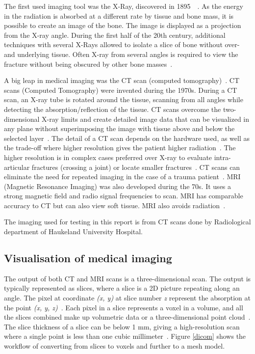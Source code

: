 \documentclass[a4paper]{report}
\begin{document}
The first used imaging tool was the X-Ray, discovered in 1895~\cite{hamblen_outline_2010}~\cite{suetens_fundamentals_2017}. As the energy in the radiation is absorbed at a different rate by tissue and bone mass, it is possible to create an image of the bone. The image is displayed as a projection from the X-ray angle. During the first half of the 20th century, additional techniques with several X-Rays allowed to isolate a slice of bone without over- and underlying tissue. Often X-ray from several angles is required to view the fracture without being obscured by other bone masses~\cite{ebnezar_textbook_2016}.

A big leap in medical imaging was the CT scan (computed tomography)~\cite{bradley_history_2008}.
CT scans (Computed Tomography) were invented during the 1970s. During a CT scan, an X-ray tube is rotated around the tissue, scanning from all angles while detecting the absorption/reflection of the tissue. CT scans overcome the two-dimensional X-ray limits and create detailed image data that can be visualized in any plane without superimposing the image with tissue above and below the selected layer~\cite{hamblen_outline_2010}. The detail of a CT scan depends on the hardware used, as well as the trade-off where higher resolution gives the patient higher radiation~\cite{bradley_history_2008}. The higher resolution is in complex cases preferred over X-ray to evaluate intra-articular fractures (crossing a joint) or locate smaller fractures~\cite{ebnezar_textbook_2016}.
CT scans can eliminate the need for repeated imaging in the case of a trauma patient~\cite{swiontkowski_manual_2013}.
MRI (Magnetic Resonance Imaging) was also developed during the 70s. It uses a strong magnetic field and radio signal frequencies to scan. MRI has comparable accuracy to CT but can also view soft tissue. MRI also avoids radiation~\cite{swiontkowski_manual_2013}.


The imaging used for testing in this report is from CT scans done by Radiological department of Haukeland University Hospital.

\subsection{Visualisation of medical imaging}


The output of both CT and MRI scans is a three-dimensional scan. The output is typically represented as slices, where a slice is a 2D picture repeating along an angle. The pixel at coordinate \emph{(x, y)} at slice number \emph{z} represent the absorption at the point \emph{(x, y, z)}~\cite{chougule_conversions_2013}.
Each pixel in a slice represents a voxel in a volume, and all the slices combined make up volumetric data or a three-dimensional point cloud~\cite{chougule_conversions_2013}.
The slice thickness of a slice can be below 1 mm, giving a high-resolution scan where a single point is less than one cubic millimeter~\cite{hamblen_outline_2010}. Figure \ref{dicom} shows the workflow of converting from slices to voxels and further to a mesh model.
\end{document}
